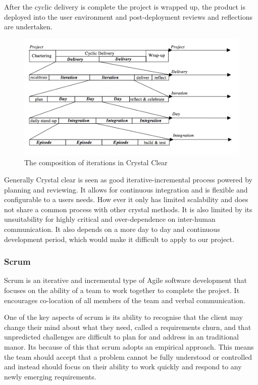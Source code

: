 \documentclass[11pt,a4paper]{article}
\begin{document}
After the cyclic delivery is complete the project is wrapped up, the product is deployed into the user environment and post-deployment reviews and reflections are undertaken. 

\begin{figure}[H]
\centering
\includegraphics[width = 140mm]{clear.png}
\caption{The composition of iterations in Crystal Clear ~\cite{Cockburn}}
\label{fig:clear}
\end{figure}

Generally Crystal clear is seen as good iterative-incremental process powered by planning and reviewing. It allows for continuous integration and is flexible and configurable to a users needs. How ever it only has limited scalability and does not share a common process with other crystal methods. It is also limited by its unsuitability for highly critical and over-dependence on inter-human communication. It also depends on a more day to day and continuous development period, which would make it difficult to apply to our project. 


\subsubsection{Scrum}

Scrum is an iterative and incremental type of Agile software development that focuses on the ability of a team to work together to complete the project. It encourages co-location of all members of the team and verbal communication. 

One of the key aspects of scrum is its ability to recognise that the client may change their mind about what they need, called a requirements churn, and that unpredicted challenges are difficult to plan for and address in an traditional manor. Its because of this that scrum adopts an empirical approach. This means the team should accept that a problem cannot be fully understood or controlled and instead should focus on their ability to work quickly and respond to any newly emerging requirements. 
\end{document}
